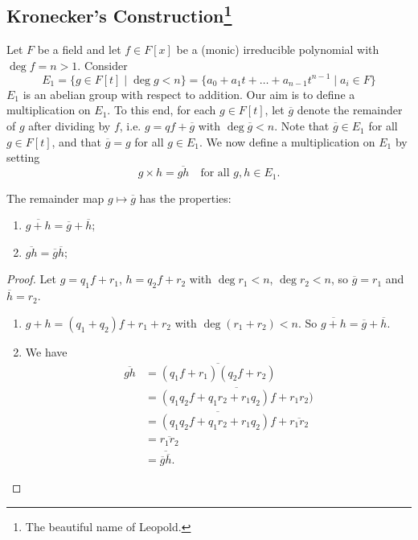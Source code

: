 \subsection[Kronecker's Construction]{Kronecker's Construction\footnote{The beautiful name of Leopold.}}
Let $F$ be a field and let $f \in F[x]$ be a (monic) irreducible polynomial with $\deg{f} = n > 1$. Consider
\[
	E_1 = \{g \in F[t] \mid \deg{g} < n\} = \{a_0 + a_1 t + \dots + a_{n - 1}t^{n - 1} \mid a_i \in F\}
\]
$E_1$ is an abelian group with respect to addition. Our aim is to define a multiplication on $E_1$. To this end, for each $g \in F[t]$, let $\overline{g}$ denote the remainder of $g$ after dividing by $f$, i.e. $g = qf + \overline{g}$ with $\deg{\overline{g}} < n$. Note that $\overline{g} \in E_1$ for all $g \in F[t]$, and that $\overline{g} = g$ for all $g \in E_1$. We now define a multiplication on $E_1$ by setting
\[
	g \times h = \overline{gh} \quad \text{for all } g, h \in E_1.
\]

\begin{lemma}
	The remainder map $g \mapsto \overline{g}$ has the properties:
	\begin{enumerate}
		\item $\overline{g + h} = \overline{g} + \overline{h}$;
		\item $\overline{gh} = \overline{g}\overline{h}$;
	\end{enumerate}
	\begin{proof}
		Let $g = q_1 f + r_1$, $h = q_2 f + r_2$ with $\deg{r_1} < n$, $\deg{r_2} < n$, so $\overline{g} = r_1$ and $\overline{h} = r_2$.
		\begin{enumerate}
			\item $g + h = (q_1 + q_2)f + r_1 + r_2$ with $\deg{(r_1 + r_2)} < n$. So $\overline{g + h} = \overline{g} + \overline{h}$.
			\item We have
			\begin{align*}
				\overline{gh} &= \overline{(q_1 f + r_1)(q_2 f + r_2)} \\
											&= \overline{(q_1 q_2 f + q_1 r_2 + r_1 q_2)f + r_1 r_2)} \\
											&= \overline{(q_1 q_2 f + q_1 r_2 + r_1 q_2)f} + \overline{r_1 r_2} \\
											&= \overline{r_1 r_2} \\
											&= \overline{\overline{g}\overline{h}}.
			\end{align*}
		\end{enumerate}
	\end{proof}
\end{lemma}

